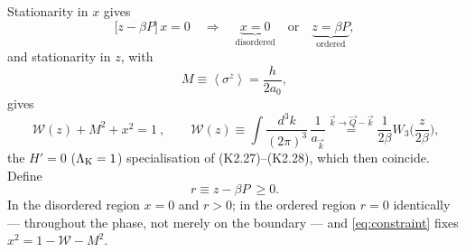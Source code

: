 \documentclass[11pt,a4paper]{article}
\newcommand{\bk}{\vec k}
\newcommand{\bQ}{\vec Q}
\newcommand{\dk}{\frac{d^3k}{(2\pi)^3}}
\newcommand{\avg}[1]{\left\langle #1 \right\rangle}
\newcommand{\Wc}{\mathcal{W}}
\newcommand{\LK}{\Lambda_{\rm K}}
\newcommand{\FLAG}[1]{\textcolor{blue}{\textbf{[#1]}}}
\newcommand{\bk}{\vec k}
\newcommand{\bQ}{\vec Q}
\newcommand{\dk}{\frac{d^3k}{(2\pi)^3}}
\newcommand{\avg}[1]{\left\langle #1 \right\rangle}
\newcommand{\Wc}{\mathcal{W}}
\newcommand{\FLAG}[1]{\textcolor{blue}{\textbf{[#1]}}}
\begin{document}

Stationarity in $x$ gives
\begin{equation}
  \big[z-\beta P\big]\,x=0
  \quad\Longrightarrow\quad
  \underbrace{x=0}_{\text{disordered}}
  \quad\text{or}\quad
  \underbrace{z=\beta P}_{\text{ordered}} ,
  \label{eq:sticking}
\end{equation}
and stationarity in $z$, with
\begin{equation}
  M\equiv\avg{\sigma^z}=\frac{h}{2a_0},
  \label{eq:M}
\end{equation}
gives
\begin{equation}
  \boxed{\ \Wc(z)+M^2+x^2=1\ },
  \qquad
  \Wc(z)\equiv\int\!\dk\,\frac{1}{a_{\bk}}
   \overset{\bk\to\bQ-\bk}{=}\frac{1}{2\beta}W_3\!\Big(\frac{z}{2\beta}\Big),
  \label{eq:constraint}
\end{equation}
the $H'=0$ ($\LK=1$) specialisation of (K2.27)--(K2.28), which then coincide. Define
\begin{equation}
  r\equiv z-\beta P\ \geq 0 .
  \label{eq:rdef}
\end{equation}
In the disordered region $x=0$ and $r>0$; in the ordered region $r=0$ identically ---
throughout the phase, not merely on the boundary --- and \eqref{eq:constraint} fixes
$x^2=1-\Wc-M^2$.
\end{document}
